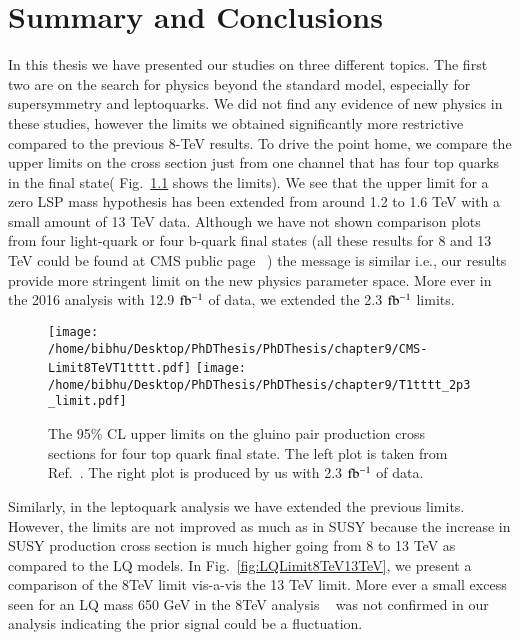 \chapter{Summary and Conclusions  \label{ Summary and Conclusions}}

In this thesis we have presented our studies on three different topics. The first two are on the search for physics beyond the standard model, especially for supersymmetry and leptoquarks. We did not find any evidence of new physics in these studies, however the limits we obtained significantly more restrictive compared to the previous 8-TeV results. To drive the point home, we compare the upper limits on the cross section just from one channel that has four top quarks in the final state( Fig.~\ref{fig:Limit8vs13SUSY} shows the limits). We see that the upper limit for a zero LSP mass hypothesis has been extended from around 1.2 to 1.6 TeV with a small amount of 13 TeV data. Although we have not shown comparison plots from four light-quark or four b-quark final states (all these results for 8 and 13 TeV could be found at CMS public page ~\cite{CMSSUSPublic})  the message is similar i.e., our results provide more stringent limit on the new physics parameter space. More ever in the 2016 analysis with 12.9 $\rm fb^{-1}$ of data, we extended the 2.3 $\rm fb^{-1}$ limits. 

\begin{figure}[h]
\centering
\texttt{[image: /home/bibhu/Desktop/PhDThesis/PhDThesis/chapter9/CMS-Limit8TeVT1tttt.pdf]}
\texttt{[image: /home/bibhu/Desktop/PhDThesis/PhDThesis/chapter9/T1tttt\_2p3\_limit.pdf]}
\caption{\label{fig:Limit8vs13SUSY}The 95\% CL upper limits on the gluino pair production cross sections for four top quark final state. The left plot is taken from Ref.~\cite{SUSYhad8TeV}. The right plot is produced by us with 2.3 $\rm fb^{-1}$ of data.}
\end{figure}


Similarly, in the leptoquark analysis we have  extended the previous limits. However, the limits are not improved as much as in SUSY because the increase in SUSY production cross section is much higher going from 8 to 13 TeV as compared to the LQ models. In Fig.~\ref{fig:LQLimit8TeV13TeV}, we present a comparison of the 8TeV limit vis-a-vis the 13 TeV limit. More ever a small excess seen for an LQ mass 650 GeV in the 8TeV analysis ~\cite{CMS-PAS-EXO-12-041} was not confirmed in our analysis indicating the prior signal could be a fluctuation.

